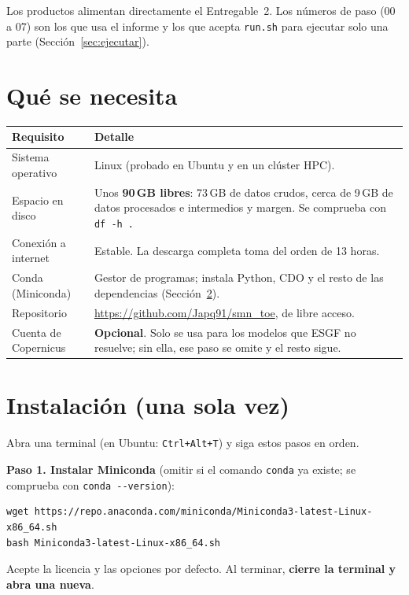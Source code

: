 \documentclass[11pt,a4paper]{article}
\newcommand{\archivo}[1]{\begingroup\hypersetup{urlcolor=black}\url{#1}\endgroup}
\begin{document}
Los productos alimentan directamente el Entregable~2. Los números de paso (00 a 07) son los que usa el informe y los que acepta \texttt{run.sh} para ejecutar solo una parte (Sección~\ref{sec:ejecutar}).

\section{Qué se necesita}

\begin{center}\small
\begin{tabular}{@{}L{3.6cm}L{\dimexpr\textwidth-3.6cm-2\tabcolsep\relax}@{}}
\toprule
Requisito & Detalle \\
\midrule
Sistema operativo & Linux (probado en Ubuntu y en un clúster HPC). \\
Espacio en disco & Unos \textbf{90\,GB libres}: 73\,GB de datos crudos, cerca de 9\,GB de datos procesados e intermedios y margen. Se comprueba con \texttt{df -h .} \\
Conexión a internet & Estable. La descarga completa toma del orden de 13 horas. \\
Conda (Miniconda) & Gestor de programas; instala Python, CDO y el resto de las dependencias (Sección~\ref{sec:instalar}). \\
Repositorio & \archivo{https://github.com/Japq91/smn_toe}, de libre acceso. \\
Cuenta de Copernicus & \textbf{Opcional}. Solo se usa para los modelos que ESGF no resuelve; sin ella, ese paso se omite y el resto sigue. \\
\bottomrule
\end{tabular}
\end{center}

\section{Instalación (una sola vez)}
\label{sec:instalar}

Abra una terminal (en Ubuntu: \texttt{Ctrl+Alt+T}) y siga estos pasos en orden.

\textbf{Paso 1. Instalar Miniconda} (omitir si el comando \texttt{conda} ya existe; se comprueba con \verb|conda --version|):
\begin{lstlisting}
wget https://repo.anaconda.com/miniconda/Miniconda3-latest-Linux-x86_64.sh
bash Miniconda3-latest-Linux-x86_64.sh
\end{lstlisting}
Acepte la licencia y las opciones por defecto. Al terminar, \textbf{cierre la terminal y abra una nueva}.
\end{document}
